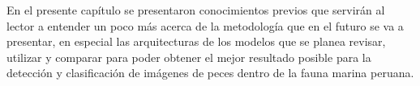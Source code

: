 En el presente capítulo se presentaron conocimientos previos que servirán al lector a entender un poco más acerca de la metodología que en el futuro se va a presentar, en especial las arquitecturas de los modelos que se planea revisar, utilizar y comparar para poder obtener el mejor resultado posible para la detección y clasificación de imágenes de peces dentro de la fauna marina peruana. 

